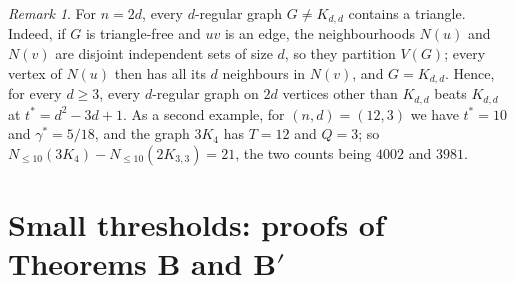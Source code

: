 \documentclass[11pt]{article}
\theoremstyle{remark}
\newtheorem{remark}[theorem]{Remark}
\newcommand{\Nle}[1]{N_{\le #1}}
\begin{document}
\begin{remark}\label{rem:n2d}
For $n=2d$, every $d$-regular graph $G\ne K_{d,d}$ contains a triangle.
Indeed, if $G$ is triangle-free and $uv$ is an edge, the neighbourhoods $N(u)$
and $N(v)$ are disjoint independent sets of size $d$, so they partition
$V(G)$; every vertex of $N(u)$ then has all its $d$ neighbours in $N(v)$, and
$G=K_{d,d}$. Hence, for every $d\ge3$,
every $d$-regular graph on $2d$ vertices other than $K_{d,d}$ beats $K_{d,d}$
at $t^*=d^2-3d+1$. As a second
example, for $(n,d)=(12,3)$ we have $t^*=10$ and $\gamma^*=5/18$, and the
graph $3K_4$ has $T=12$ and $Q=3$; so
$\Nle{10}(3K_4)-\Nle{10}(2K_{3,3})=21$, the two counts being $4002$ and
$3981$.
\end{remark}

\section{\texorpdfstring{Small thresholds: proofs of Theorems B and B$'$}{Small thresholds: proofs of Theorems B and B'}}\label{sec:B}
\end{document}
